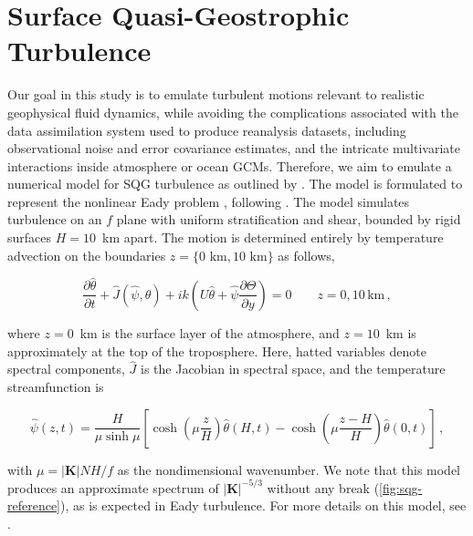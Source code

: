 \section{Surface Quasi-Geostrophic Turbulence}
\label{sec:sqg}

Our goal in this study is to emulate turbulent motions relevant to realistic
geophysical fluid dynamics, while avoiding the complications associated with the
data assimilation system used to produce reanalysis datasets, including
observational noise and error covariance estimates, and the intricate
multivariate interactions inside atmosphere or ocean GCMs.
Therefore, we aim to emulate a numerical model for SQG turbulence
\citep{held_surface_1995,blumen_uniform_1978}
as outlined by \citet{tulloch_note_2009}.
The model is formulated to represent the nonlinear Eady problem
\citep{eady_long_1949}, following \citet{blumen_uniform_1978-1}.
The model simulates turbulence
on an $f$ plane with uniform stratification and shear, bounded by rigid surfaces $H=10$~km apart.
The motion is determined entirely by temperature advection on the boundaries
$z=\{0\text{~km},10\text{~km}\}$ as follows,
\begin{linenomath*}\begin{equation*}
    \dfrac{\partial \hat{\theta}}{\partial t} +
    \hat{J}(\hat{\psi}, \hat{\theta}) + ik\left(U \hat{\theta} +
        \hat{\psi}\dfrac{\partial \Theta}{\partial y}\right)
    = 0 \qquad z = 0, 10\,\text{km} \, ,
\end{equation*}\end{linenomath*}
where $z=0$~km is the surface layer of the atmosphere, and $z=10$~km is
approximately at the top of the troposphere.
Here, hatted variables denote spectral components, $\hat{J}$ is the Jacobian in spectral space, and the temperature streamfunction is
\begin{linenomath*}\begin{equation*}
    \hat{\psi}(z,t) = \dfrac{H}{\mu\sinh\mu}
    \left[ \cosh\left(\mu\dfrac{z}{H}\right) \hat{\theta}(H,t)
        - \cosh\left(\mu\dfrac{z-H}{H}\right) \hat{\theta}(0,t)
    \right]\, ,
\end{equation*}\end{linenomath*}
with $\mu = |\mathbf{K}| NH/f$ as the nondimensional wavenumber.
We note that this model produces an approximate spectrum of
$|\mathbf{K}|^{-5/3}$ without any break (\cref{fig:sqg-reference}),
as is expected in Eady turbulence.
For more details on this model, see \citet{tulloch_note_2009}.


